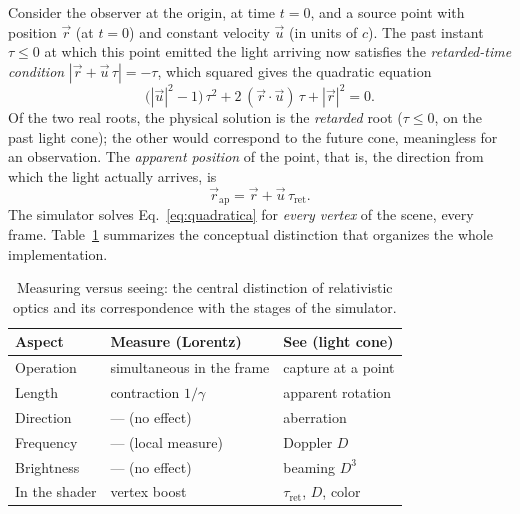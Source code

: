 \documentclass[10pt,a4paper,twocolumn]{article}
\begin{document}
Consider the observer at the origin, at time $t = 0$, and a source point with position
$\vec{r}$ (at $t=0$) and constant velocity $\vec{u}$ (in units of $c$). The past instant
$\tau \leq 0$ at which this point emitted the light arriving now satisfies the
\emph{retarded-time condition} $|\vec{r} + \vec{u}\,\tau| = -\tau$, which squared gives
the quadratic equation
\begin{equation}
  \bigl(|\vec{u}|^{2}-1\bigr)\,\tau^{2}
  + 2\,(\vec{r}\cdot\vec{u})\,\tau
  + |\vec{r}|^{2} = 0 .
  \label{eq:quadratica}
\end{equation}
Of the two real roots, the physical solution is the \emph{retarded} root ($\tau \leq 0$,
on the past light cone); the other would correspond to the future cone, meaningless for
an observation. The \emph{apparent position} of the point, that is, the direction from
which the light actually arrives, is
\begin{equation}
  \vec{r}_{\mathrm{ap}} = \vec{r} + \vec{u}\,\tau_{\mathrm{ret}} .
  \label{eq:aparente}
\end{equation}
The simulator solves Eq.~\eqref{eq:quadratica} for \emph{every vertex} of the scene,
every frame. Table~\ref{tab:medirver} summarizes the conceptual distinction that
organizes the whole implementation.

\begin{table}[t]
  \centering
  \caption{Measuring versus seeing: the central distinction of relativistic optics and
           its correspondence with the stages of the simulator.}
  \label{tab:medirver}
  \footnotesize
  \setlength{\tabcolsep}{4pt}
  \begin{tabular}{@{}lll@{}}
    \toprule
    Aspect & Measure (Lorentz) & See (light cone) \\
    \midrule
    Operation  & simultaneous in the frame & capture at a point \\
    Length     & contraction $1/\gamma$    & apparent rotation \\
    Direction  & --- (no effect)           & aberration \\
    Frequency  & --- (local measure)       & Doppler $D$ \\
    Brightness & --- (no effect)           & beaming $D^{3}$ \\
    In the shader & vertex boost           & $\tau_{\mathrm{ret}}$, $D$, color \\
    \bottomrule
  \end{tabular}
\end{table}
\end{document}
